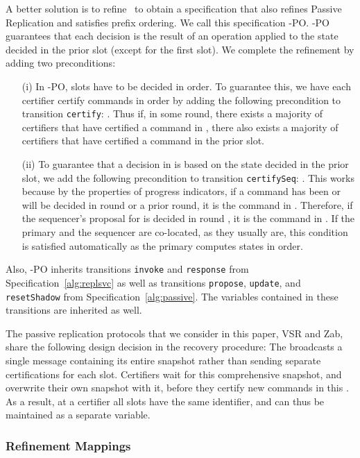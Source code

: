 A better solution is to refine \multiconsensus\ to obtain a
specification that also refines Passive Replication and satisfies
prefix ordering.  We call this specification \multiconsensus-PO.
\multiconsensus-PO guarantees that each decision is the result
of an operation applied to the state decided in the prior slot
(except for the first slot).
We complete the refinement by adding two preconditions:
\begin{enumerate}
\item[(i)]
In \multiconsensus-PO, slots have to be decided in order.
To guarantee this, we have each certifier certify commands
in order by adding the following
precondition to transition \texttt{certify}:
 .
Thus if, in some round, there exists a majority of certifiers that have
certified a command in , there also exists a majority of certifiers
that have certified a command in the prior slot.

\item[(ii)]
To guarantee that a decision in  is based on the state
decided in the prior slot, we add the following precondition to transition \texttt{certifySeq}:
.
This works because by the properties of progress indicators, if a
command has been or will be decided in round  or a prior round,
it is the command in .
Therefore, if the sequencer's proposal for  is decided in round , it is the command in .
If the primary and the sequencer are co-located, as they usually are,
this condition is satisfied automatically as the primary computes
states in order.
\end{enumerate}

Also, \multiconsensus-PO inherits transitions \texttt{invoke} and \texttt{response} from Specification~\ref{alg:replsvc} as well as transitions
\texttt{propose}, \texttt{update}, and \texttt{resetShadow} from Specification~\ref{alg:passive}.  The variables contained in these transitions are inherited as well.

The passive replication protocols that we consider in this paper,
VSR and Zab,
share the following design decision in the recovery procedure: The
{\sequencer} broadcasts a single message containing its entire
snapshot rather than sending separate certifications for each slot.
Certifiers wait for this comprehensive snapshot, and overwrite their
own snapshot with it, before they certify new commands in this {\round}.
As a result, at a certifier all  slots have the same {\round}
identifier, and can thus be maintained as a separate variable.  

\subsubsection{Refinement Mappings}
\label{sec:MCPO:refinement}

